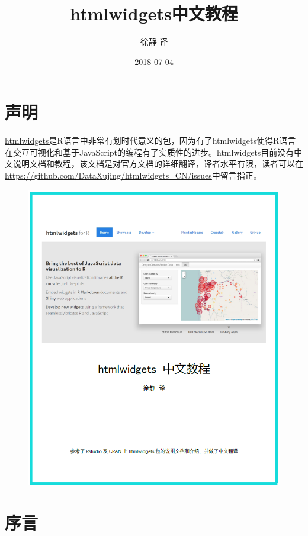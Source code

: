 \documentclass[]{book}
\title{htmlwidgets中文教程}
\author{徐静 译}
\date{2018-07-04}
\theoremstyle{definition}
\theoremstyle{definition}
\theoremstyle{definition}
\theoremstyle{remark}
\begin{document}
\maketitle

{
\setcounter{tocdepth}{1}
\tableofcontents
}
\chapter*{声明}

\href{https://CRAN.R-project.org/package=htmlwidgets}{htmlwidgets}是R语言中非常有划时代意义的包，因为有了htmlwidgets使得R语言在交互可视化和基于JavaScript的编程有了实质性的进步。htmlwidgets目前没有中文说明文档和教程，该文档是对官方文档的详细翻译，译者水平有限，读者可以在\url{https://github.com/DataXujing/htmlwidgets_CN/issues}中留言指正。

\begin{figure}
\centering
\includegraphics{pic/cover.png}
\caption{}
\end{figure}

\chapter*{序言}
\end{document}
